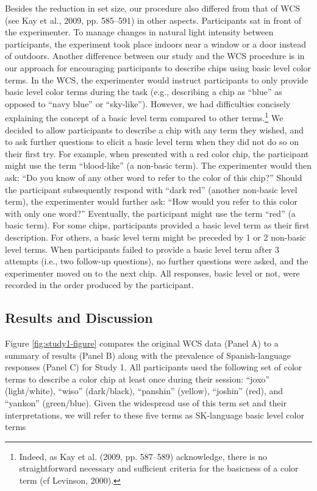 \documentclass[
  english,
  ,apa7,floatsintext]{apa6}
\begin{document}
Besides the reduction in set size, our procedure also differed from that of WCS (see Kay et al., 2009, pp. 585--591) in other aspects. Participants sat in front of the experimenter. To manage changes in natural light intensity between participants, the experiment took place indoors near a window or a door instead of outdoors. Another difference between our study and the WCS procedure is in our approach for encouraging participants to describe chips using basic level color terms. In the WCS, the experimenter would instruct participants to only provide basic level color terms during the task (e.g., describing a chip as ``blue'' as opposed to ``navy blue'' or ``sky-like''). However, we had difficulties concisely explaining the concept of a basic level term compared to other terms.\footnote{Indeed, as Kay et al. (2009, pp. 587--589) acknowledge, there is no straightforward necessary and sufficient criteria for the basicness of a color term (cf Levinson, 2000).} We decided to allow participants to describe a chip with any term they wished, and to ask further questions to elicit a basic level term when they did not do so on their first try. For example, when presented with a red color chip, the participant might use the term ``blood-like'' (a non-basic term). The experimenter would then ask: ``Do you know of any other word to refer to the color of this chip?'' Should the participant subsequently respond with ``dark red'' (another non-basic level term), the experimenter would further ask: ``How would you refer to this color with only one word?'' Eventually, the participant might use the term ``red'' (a basic term). For some chips, participants provided a basic level term as their first description. For others, a basic level term might be preceded by 1 or 2 non-basic level terms. When participants failed to provide a basic level term after 3 attempts (i.e., two follow-up questions), no further questions were asked, and the experimenter moved on to the next chip. All responses, basic level or not, were recorded in the order produced by the participant.

\hypertarget{results-and-discussion}{%
\subsection{Results and Discussion}\label{results-and-discussion}}

Figure \ref{fig:study1-figure} compares the original WCS data (Panel A) to a summary of results (Panel B) along with the prevalence of Spanish-language responses (Panel C) for Study 1. All participants used the following set of color terms to describe a color chip at least once during their session: ``joxo'' (light/white), ``wiso'' (dark/black), ``panshin'' (yellow), ``joshin'' (red), and ``yankon'' (green/blue). Given the widespread use of this term set and their interpretations, we will refer to these five terms as SK-language basic level color terms
\end{document}

